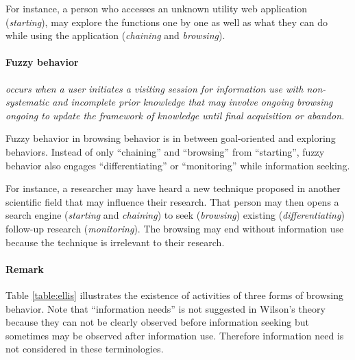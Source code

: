 For instance, a person who accesses an unknown utility web application (\emph{starting}), 
may explore the functions one by one as well as 
what they can do while using the application (\emph{chaining} and \emph{browsing}).

\paragraph{Fuzzy behavior} \emph{occurs when a user initiates a visiting session for information use
with non-systematic and incomplete prior knowledge that may involve ongoing browsing ongoing to update 
the framework of knowledge until final acquisition or abandon.}

Fuzzy behavior in browsing behavior is in between goal-oriented and exploring behaviors.
Instead of only ``chaining'' and ``browsing'' from ``starting'', fuzzy behavior also engages
``differentiating'' or ``monitoring'' while information seeking.

For instance, a researcher may have heard a new technique proposed in another scientific field 
that may influence their research. That person may then 
opens a search engine (\emph{starting} and \emph{chaining}) to seek (\emph{browsing}) 
existing (\emph{differentiating}) follow-up research (\emph{monitoring}). 
The browsing may end without information use because the technique is irrelevant 
to their research.

\paragraph{Remark} Table \ref{table:ellis} illustrates the existence of activities of three
forms of browsing behavior. 
Note that ``information needs'' is not suggested in Wilson's theory \cite{wilson1981user} 
because they can not be clearly observed before information seeking but sometimes
may be observed after information use. Therefore information need is not considered in these terminologies.

